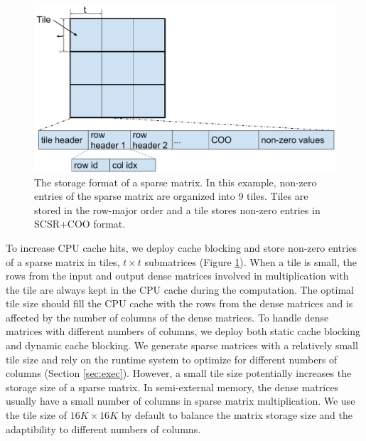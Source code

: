 \begin{figure}
\centering
\includegraphics[scale=0.3]{SpMM_figs/sparse_mat.pdf}
\caption{The storage format of a sparse matrix. In this example, non-zero
entries of the sparse matrix are organized into 9 tiles. Tiles are stored in
the row-major order and a tile stores non-zero entries in SCSR+COO format.}
\label{sparse_mat}
\end{figure}

To increase CPU cache hits, we deploy cache blocking \cite{Im04} and store
non-zero entries of a sparse matrix in tiles, $t \times t$ submatrices (Figure
\ref{sparse_mat}).
When a tile is small, the rows from the input and output dense matrices
involved in multiplication with the tile are always kept in the CPU cache
during the computation. The optimal tile size should fill the CPU cache
with the rows from the dense matrices and is affected by the number of columns
of the dense matrices. To handle dense matrices with different numbers
of columns, we deploy both static cache blocking and dynamic cache blocking.
We generate sparse matrices with a relatively small tile size and
rely on the runtime system
to optimize for different numbers of columns (Section \ref{sec:exec}).
However, a small tile size potentially increases the storage size of a sparse
matrix. In semi-external memory, the dense matrices usually have
a small number of columns in sparse matrix multiplication. We
use the tile size of $16K \times 16K$ by default to balance the matrix storage
size and the adaptibility to different numbers of columns.


